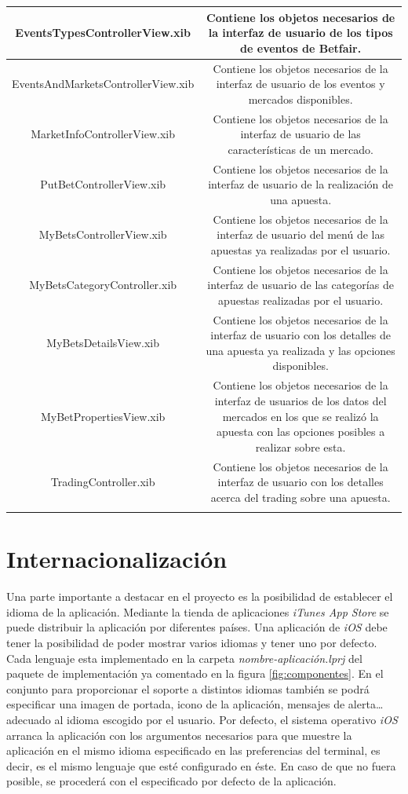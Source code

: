 \begin{supertabular}{||c|c||}
\hline
EventsTypesControllerView.xib & Contiene los objetos necesarios de la interfaz de usuario de los tipos de eventos de Betfair. \\
\hline
EventsAndMarketsControllerView.xib & Contiene los objetos necesarios de la interfaz de usuario de los eventos y mercados disponibles. \\
\hline
MarketInfoControllerView.xib & Contiene los objetos necesarios de la interfaz de usuario de las características de un mercado. \\
\hline
PutBetControllerView.xib & Contiene los objetos necesarios de la interfaz de usuario de la realización de una apuesta. \\
\hline
MyBetsControllerView.xib & Contiene los objetos necesarios de la interfaz de usuario del menú de las apuestas ya realizadas por el usuario. \\
\hline
MyBetsCategoryController.xib & Contiene los objetos necesarios de la interfaz de usuario de las categorías de apuestas realizadas por el usuario. \\
\hline
MyBetsDetailsView.xib & Contiene los objetos necesarios de la interfaz de usuario con los detalles de una apuesta ya realizada y las opciones disponibles. \\
\hline
MyBetPropertiesView.xib & Contiene los objetos necesarios de la interfaz de usuarios de los datos del mercados en los que se realizó la apuesta con las opciones posibles a realizar sobre esta. \\
\hline
TradingController.xib & Contiene los objetos necesarios de la interfaz de usuario con los detalles acerca del trading sobre una apuesta. \\
\hline 
\label{fig:componentes}
\end{supertabular} 
  
  
 
\section{Internacionalización}
 Una parte importante a destacar en el proyecto es la posibilidad de establecer el idioma de la aplicación. Mediante la tienda de aplicaciones \emph{iTunes App Store} se puede distribuir la aplicación por diferentes países. Una aplicación de \emph{iOS} debe tener la posibilidad de poder mostrar varios idiomas y tener uno por defecto. Cada lenguaje esta implementado en la carpeta \emph{nombre-aplicación.lprj} del paquete de implementación ya comentado en la figura \ref{fig:componentes}. En el conjunto para proporcionar el soporte a distintos idiomas también se podrá especificar una imagen de portada, icono de la aplicación, mensajes de alerta\ldots  adecuado al idioma escogido por el usuario. Por defecto, el sistema operativo \emph{iOS} arranca la aplicación con los argumentos necesarios para que muestre la aplicación en el mismo idioma especificado en las preferencias del terminal, es decir, es el mismo lenguaje que esté configurado en éste. En caso de que no fuera posible, se procederá con el especificado por defecto de la aplicación.

